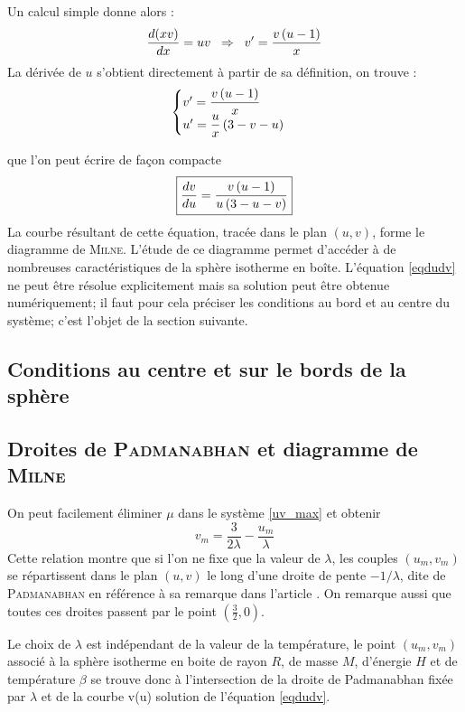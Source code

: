 Un calcul simple donne alors :
\begin{equation}
	\dfrac{d(xv)}{dx} = uv \;\;\Rightarrow\;\; v' = \frac{v \left( u - 1\right)}{x} \notag
\end{equation}
La dérivée de $u$ s'obtient directement à partir de sa définition, on trouve :
	$$\begin{cases}
		v' = \dfrac{v \left( u - 1\right)}{x} \\
		u' = \dfrac{u}{x}\left(3 - v - u\right)
	\end{cases} \label{systdudv}$$
	
	que l'on peut écrire de façon compacte
	\begin{equation}
		\fbox{$
		\dfrac{d v}{d u} = \dfrac{v \left( u - 1\right)}{u \left(3 - u - v\right)}
		$} \label{eqdudv}
	\end{equation}
	La courbe résultant de cette équation, tracée dans le plan $\left(u, v\right)$, forme le diagramme
	de \textsc{Milne}. L'étude de ce diagramme permet d'accéder à de nombreuses caractéristiques de la sphère isotherme en boîte. L'équation \ref{eqdudv} ne peut être résolue explicitement mais sa solution peut être obtenue numériquement; il faut pour cela préciser les conditions au bord et au centre du système; c'est l'objet de la section suivante.
	

\subsection{Conditions au centre et sur le bords de la sphère}
	

\subsection{Droites de \textsc{Padmanabhan} et diagramme de \textsc{Milne}}
	On peut facilement éliminer $\mu$ dans le système \ref{uv_max} et obtenir
	\begin{equation}
		v_m = \frac{3}{2\lambda} - \frac{u_m}{\lambda}\label{droitePb}
	\end{equation}
	Cette relation montre que si l'on ne fixe que la valeur de $\lambda$,  les couples $(u_m,v_m)$  se répartissent dans le plan $(u,v)$ le long d'une droite de pente $-1/\lambda$, dite de \textsc{Padmanabhan} en référence à sa remarque dans l'article \cite{1989ApJS...71..651P}. On remarque aussi que toutes ces droites passent par le point $(\frac{3}{2},0)$.
	
	Le choix de $\lambda$ est indépendant de la valeur de la température, le point $(u_m,v_m)$ associé à la sphère isotherme en boite de rayon $R$, de masse $M$, d'énergie $H$ et de température $\beta$ se trouve donc à l'intersection de la droite de Padmanabhan fixée par $\lambda$ et de la courbe v(u) solution de l'équation \ref{eqdudv}. 
	
